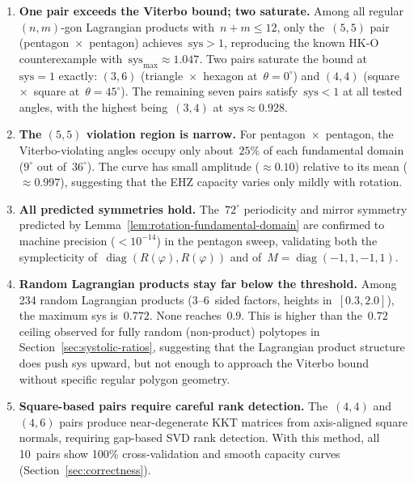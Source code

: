 \begin{enumerate}
\item \textbf{One pair exceeds the Viterbo bound; two saturate.}
  Among all regular $(n,m)$-gon Lagrangian products with~$n + m \le 12$,
  only the~$(5,5)$ pair (pentagon~$\times$~pentagon) achieves~$\mathrm{sys} > 1$,
  reproducing the known HK-O counterexample
  with~$\mathrm{sys}_{\max} \approx 1.047$.
  Two pairs saturate the bound at~$\mathrm{sys} = 1$ exactly:
  $(3,6)$ (triangle~$\times$~hexagon at~$\theta = 0^\circ$) and
  $(4,4)$ (square~$\times$~square at~$\theta = 45^\circ$).
  The remaining seven pairs satisfy~$\mathrm{sys} < 1$ at all tested
  angles, with the highest being~$(3,4)$ at~$\mathrm{sys} \approx 0.928$.

\item \textbf{The $(5,5)$ violation region is narrow.}
  For pentagon~$\times$~pentagon, the Viterbo-violating angles occupy only
  about~$25\%$ of each fundamental domain ($9^\circ$ out of~$36^\circ$).
  The curve has small amplitude ($\approx 0.10$) relative to its mean
  ($\approx 0.997$), suggesting that the EHZ capacity varies only mildly
  with rotation.

\item \textbf{All predicted symmetries hold.}
  The~$72^\circ$ periodicity and mirror symmetry predicted by
  Lemma~\ref{lem:rotation-fundamental-domain} are confirmed to machine
  precision ($< 10^{-14}$) in the pentagon sweep, validating both the
  symplecticity of~$\operatorname{diag}(R(\varphi), R(\varphi))$ and
  of~$M = \operatorname{diag}(-1, 1, -1, 1)$.

\item \textbf{Random Lagrangian products stay far below the threshold.}
  Among 234 random Lagrangian products (3--6~sided factors, heights
  in~$[0.3, 2.0]$), the maximum sys is~$0.772$. None reaches~$0.9$.
  This is higher than the~$0.72$ ceiling observed for fully random
  (non-product) polytopes in Section~\ref{sec:systolic-ratios},
  suggesting that the Lagrangian product structure does push sys upward,
  but not enough to approach the Viterbo bound without specific
  regular polygon geometry.

\item \textbf{Square-based pairs require careful rank detection.}
  The~$(4,4)$ and~$(4,6)$ pairs produce near-degenerate KKT matrices
  from axis-aligned square normals, requiring gap-based SVD rank
  detection. With this method, all 10~pairs show 100\% cross-validation
  and smooth capacity curves (Section~\ref{sec:correctness}).
\end{enumerate}
